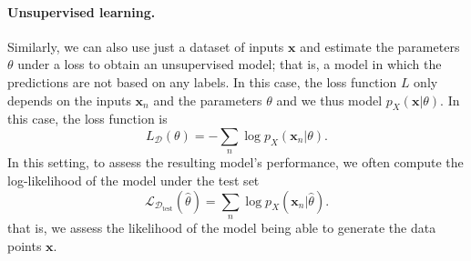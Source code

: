 \paragraph*{Unsupervised learning.} Similarly, we can also use just a
dataset of inputs $\bm{x}$ and estimate the parameters $\theta$ under a loss to
obtain an unsupervised model; that is, a model in which the predictions are
not based on any labels. In this case, the loss function $L$ only
depends on the inputs $\bm{x}_n$ and the parameters $\theta$
and we thus model $p_X(\bm{x}|\theta)$.
In this case, the loss function is
%
\begin{equation}
    L_\mathcal{D}\left(\theta\right)=-\sum_n\log p_X\left(\bm{x}_n|\theta\right).
\end{equation}
%
In this setting, to assess the resulting model's performance,
we often compute the log-likelihood of the model under the test set
%
\begin{equation}
    \mathcal{L}_{\mathcal{D}_\text{test}}(\hat{\theta}) =
    \sum_n\log p_X\left(\bm{x}_n|\hat{\theta}\right).
\end{equation}
%
that is, we assess the likelihood of the model being able to generate
the data points $\bm{x}$.


